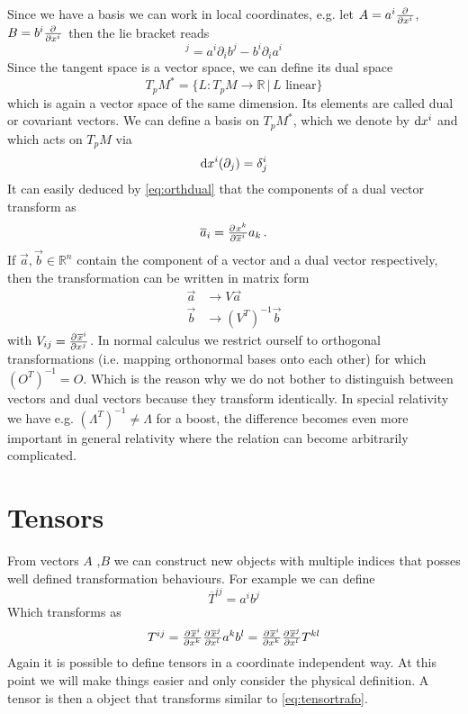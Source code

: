 Since we have a basis we can work in local coordinates, e.g. let $A=a^i\pd{}{{x^i}}$, $B=b^i\pd{}{{x^i}}$ then the lie bracket reads
\begin{equation}
    [A,B]^j=a^i\partial_ib^j-b^i\partial_ia^i
\end{equation}
Since the tangent space is a vector space, we can define its dual space
\begin{equation}
    T_pM^*=\{L:T_pM\to \mathbb{R}\, |\, L \text{ linear}\}
\end{equation}
which is again a vector space of the same dimension. Its elements are called dual or covariant vectors.
We can define a basis on $	T_pM^*$, which we denote by $\dif x^i$ and  which acts on $T_pM$ via
\begin{equation}
    \dif x^i(\partial_j)=\delta^i_j\label{eq:orthdual}
\end{equation}
It can easily deduced by \eqref{eq:orthdual} that the components of a dual vector transform as
\begin{equation}
    \overline{a}_i=\pd{x^k}{{\overline{x}^i}}a_k\, .
\end{equation}
If $\vec{a},\vec{b}\in\mathbb{R}^n$ contain the component of a vector and a dual vector respectively, 
then the transformation can be written in matrix form
\begin{align*}
    \vec{a}&\to V\vec{a}\\
    \vec{b}&\to\left(V^T\right)^{-1}\vec{b}
\end{align*}
with $V_{ij}=\pd{\overline{x}^i}{{x^j}}$. 
In normal calculus we restrict ourself to orthogonal transformations (i.e. mapping orthonormal bases onto each other) for which $(O^T)^{-1}=O$. 
Which is the reason why we do not bother to distinguish between vectors and dual vectors because they transform identically. 
In special relativity we have e.g. $(\Lambda^T)^{-1}\neq\Lambda$ for a boost, the difference becomes even more important in general 
relativity where the relation can become arbitrarily complicated.
\section{Tensors}
From vectors $A$ ,$B$ we can construct new objects with multiple indices that posses well defined transformation behaviours. 
For example we can define
\begin{equation}
    \overline{T}^{ij}=a^ib^j
\end{equation}
Which transforms as
\begin{equation}
    T^{ij}=\pd{\overline{x}^i}{{x^k}}\pd{\overline{x}^j}{{x^l}}a^kb^l=\pd{\overline{x}^i}{{x^k}}\pd{\overline{x}^j}{{x^l}}T^{kl}\label{eq:tensortrafo}
\end{equation}
Again it is possible to define tensors in a coordinate independent way. 
At this point we will make things easier and only consider the physical definition. 
A tensor is then a object that transforms similar to \eqref{eq:tensortrafo}.
